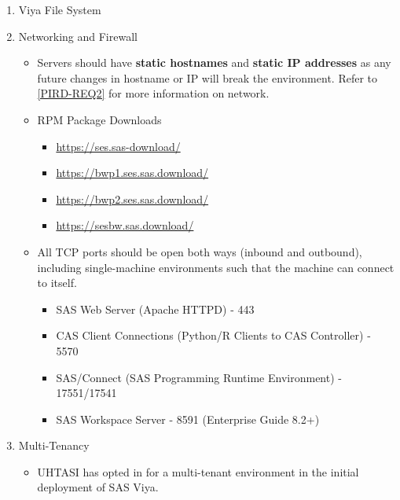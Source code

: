 \begin{enumerate}
    \item Viya File System
    \item Networking and Firewall
    \begin{itemize}
        \item Servers should have \textbf{static hostnames} and \textbf{static IP addresses} as any future changes in hostname or IP will break the environment. Refer to \ref{PIRD-REQ2} for more information on network.
        \item RPM Package Downloads
        \begin{itemize}
            \item \href{https://ses.sas-download/}{https://ses.sas-download/}
            \item \href{https://bwp1.ses.sas.download/}{https://bwp1.ses.sas.download/}
            \item \href{https://bwp2.ses.sas.download/}{https://bwp2.ses.sas.download/}
            \item \href{https://sesbw.sas.download/}{https://sesbw.sas.download/}
        \end{itemize}
        \item All TCP ports should be open both ways (inbound and outbound), including single-machine environments such that the machine can connect to itself. 
        \begin{itemize}
            \item SAS Web Server (Apache HTTPD) - 443
            \item CAS Client Connections (Python/R Clients to CAS Controller) - 5570
            \item SAS/Connect (SAS Programming Runtime Environment) - 17551/17541
            \item SAS Workspace Server - 8591 (Enterprise Guide 8.2+)
        \end{itemize}
    \end{itemize}
    \item Multi-Tenancy
    \begin{itemize}
        \item UHTASI has opted in for a multi-tenant environment in the initial deployment of SAS Viya.
    \end{itemize}

\end{enumerate}
